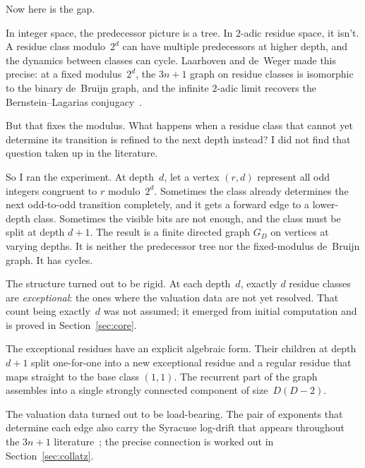 \documentclass[11pt]{amsart}
\theoremstyle{definition}
\theoremstyle{remark}
\begin{document}
Now here is the gap.

In integer space, the predecessor picture is a tree.  In $2$-adic residue
space, it isn't.  A residue class modulo~$2^d$ can have multiple predecessors
at higher depth, and the dynamics between classes can cycle.  Laarhoven and
de~Weger made this precise: at a fixed modulus~$2^d$, the $3n+1$ graph on
residue classes is isomorphic to the binary de~Bruijn graph, and the infinite
$2$-adic limit recovers the Bernstein--Lagarias
conjugacy~\cite{LaarhovenDeWeger2013}.

But that fixes the modulus.  What happens when a residue class that cannot yet
determine its transition is refined to the next depth instead?  I did not find
that question taken up in the literature.

So I ran the experiment.  At depth~$d$, let a vertex $(r,d)$ represent all odd
integers congruent to $r$ modulo~$2^d$.  Sometimes the class already
determines the next odd-to-odd transition completely, and it gets a forward
edge to a lower-depth class.  Sometimes the visible bits are not enough, and
the class must be split at depth $d+1$.  The result is a finite directed graph
$G_D$ on vertices at varying depths.  It is neither the predecessor tree nor
the fixed-modulus de~Bruijn graph.  It has cycles.

The structure turned out to be rigid.  At each depth~$d$, exactly $d$ residue
classes are \emph{exceptional}: the ones where the valuation data are not yet
resolved.  That count being exactly~$d$ was not assumed; it emerged from initial
computation and is proved in Section~\ref{sec:core}.

The exceptional residues have an explicit algebraic form. Their
children at depth $d+1$ split one-for-one into a new exceptional residue and a
regular residue that maps straight to the base class $(1,1)$. The recurrent
part of the graph assembles into a single strongly connected component of
size~$D(D-2)$.

The valuation data turned out to be load-bearing.  The pair of exponents that
determine each edge also carry the Syracuse log-drift that appears throughout
the $3n+1$ literature~\cite{Terras1976, Everett1977, Eliahou1993, Tao2022};
the precise connection is worked out in Section~\ref{sec:collatz}.
\end{document}
